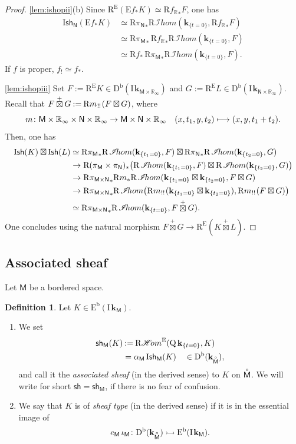 \documentclass[JEP,XML,SOM,Unicode]{cedram}
\let\mathcal\mathscr
\newcommand\mto{\mathchoice{\longmapsto}{\mapsto}{\mapsto}{\mapsto}}
\newenvironment{enumeratei}
{\bgroup\def\theenumi{\roman{enumi}}\def\theenumii{\alph{enumii}}\begin{enumerate}}
{\end{enumerate}\egroup}
\newcommand{\bl}{\bigl(}
\newcommand{\br}{\bigr)}
\theoremstyle{plain}
\theoremstyle{definition}
\newtheorem{definition}[theorem]{Definition}
\newcommand{\R}{\mathbb{R}}
\newcommand{\bR}{{\R_\infty}}
\DeclareMathOperator{\quot}{Q}
\newcommand{\derived}[1]{\mathrm{#1}}
\newcommand{\derd}{\derived{D}}
\newcommand{\dere}{\derived{E}}\let\enh\dere
\newcommand{\derr}{\derived{R}}
\newcommand{\BDC}{\derd^{\mathrm{b}}}
\newcommand{\BEC}[2][\ifield]{\dere^{\mathrm{b}}(#1_{#2})}
\newcommand{\oim}[1]{#1_*}
\newcommand{\eim}[1]{#1_!}
\newcommand{\roim}[1]{\derr#1_*}
\newcommand{\reeim}[1]{\derr#1_{\mspace{1mu}!!}\mspace{1mu}}
\newcommand{\rhom}{{\derr\sheaffont{H}\!om}}
\newcommand{\fhom}{\rhom^\enh}
\newcommand{\rihom}{{\derr\mspace{2mu}\shi\!hom}}
\newcommand{\etens}[1][]{\mathbin{\boxtimes_{\raise1.5ex\hbox to-.1em{}#1}}}
\newcommand{\sheaffont}[1]{\mathcal{#1}}
\newcommand\shi{\sheaffont{I}}
\newcommand{\RE}{\operatorname{R^\enh}}
\newcommand{\Eoim}[1]{\enh#1_*}
\newcommand{\field}{\mathbf{k}}\let\cor\field
\newcommand{\ind}{\mathrm{I}\mspace{2mu}}
\newcommand{\ifield}{\ind\field}
\newcommand{\unbordered}[1]{{\accentset{\circ}{#1}}}
\newcommand{\cetens}{\mathbin{\mathop\boxtimes\limits^+}}
\newcommand{\sh}{\mathsf{sh}}
\newcommand{\Ish}{\mathrm{I}\mathsf{sh}}
\newcommand{\bbM}{\mathsf{M}}
\newcommand{\obM}{\unbordered{\bbM}}
\newcommand{\bbN}{\mathsf{N}}
\newcommand{\defeq}{\mathbin{:=}}\let \seteq\defeq
\newcommand{\st}[1]{{\{{#1}\}}}
\begin{document}
\begin{proof}
\eqref{lem:ishopii}(b)
Since $\RE(\Eoim f K) \simeq \roim{{f_\R}}F$, one has
\begin{align*}
\Ish_{\bbN}(\Eoim f K)
&\simeq \roim{{\pi_\bbN}} \rihom(\field_{\st{t=0}}, \roim{{f_\R}}F) \\
&\simeq \roim{{\pi_\bbM}}\, \roim{{f_\R}}\rihom(\field_{\st{t=0}}, F) \\
&\simeq \roim f\,\roim{{\pi_\bbM}} \rihom(\field_{\st{t=0}}, F).
\end{align*}
If $f$ is proper, $\eim f\simeq\oim f$.

\eqref{lem:ishopiii}
Set $F\defeq\RE K\in\BDC(\ifield_{\bbM\times\bR})$ and $G\defeq\RE L\in\BDC(\ifield_{\bbN\times\bR})$.
Recall that $F\cetens G \defeq \reeim m(F\etens G)$, where
\[
m\colon \bbM\times\bR \times\bbN\times\bR \to \bbM\times\bbN\times\bR \quad
(x,t_1,y,t_2)\mto (x,y,t_1+t_2).
\]
Then, one has
\begin{align*}
\Ish(K){}\etens\Ish(L)
&\simeq \roim{{\pi_\bbM}}\rihom(\field_{\st{t_1=0}}, F) \etens \roim{{\pi_\bbN}}\rihom(\field_{\st{t_2=0}}, G) \\
&\to \roim{(\pi_\bbM\times\pi_\bbN)}\bl\rihom(\field_{\st{t_1=0}}, F) \etens \rihom(\field_{\st{t_2=0}}, G)\br \\
&\to \roim{{\pi_{\bbM\times\bbN}}}\roim m\rihom(\field_{\st{t_1=0}}\etens\field_{\st{t_2=0}}, F\etens G) \\
&\to \roim{{\pi_{\bbM\times\bbN}}}\rihom\bl
\reeim m(\field_{\st{t_1=0}}\etens\field_{\st{t_2=0}}), \reeim m (F\etens G)\br \\
&\simeq \roim{{\pi_{\bbM\times\bbN}}}\rihom(\field_{\st{t=0}}, F\cetens G).
\end{align*}
One concludes using the natural morphism $F\cetens G \to \RE(K\cetens L)$.
\end{proof}

\subsection{Associated sheaf}

Let $\bbM$ be a bordered space.

\begin{definition}
Let $K\in\BEC \bbM$.
\begin{enumeratei}
\item
We set
\begin{align*}
\sh_\bbM(K) &\defeq \fhom(\quot\field_{\st{t=0}},K) \\
&= \alpha_\bbM\,\Ish_\bbM(K) \quad \in \BDC(\field_\obM),
\end{align*}
and call it the \emph{associated sheaf} (in the derived sense) to $K$ on $\obM$.
We will write for short $\sh=\sh_\bbM$, if there is no fear of confusion.
\item
We say that $K$ is of \emph{sheaf type} (in the derived sense) if it is in the essential image of
\[
e_\bbM\,\iota_\bbM\colon \BDC(\field_\obM) \rightarrowtail\BEC\bbM.
\]
\end{enumeratei}
\end{definition}
\end{document}
